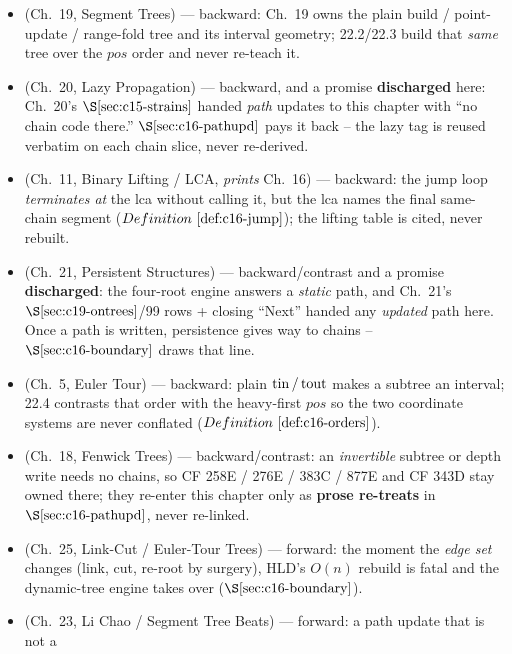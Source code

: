 \begin{itemize}[nosep, leftmargin=1.4em]
  \item {} (Ch.~19, Segment Trees) --- backward: Ch.~19 owns the plain
        build / point-update / range-fold tree and its interval geometry; 22.2/22.3 build that
        \emph{same} tree over the \(\mathit{pos}\) order and never re-teach it.
  \item {} (Ch.~20, Lazy Propagation) --- backward, and a promise \textbf{discharged}
        here: Ch.~20's \(\secref{c15-strains}\) handed \emph{path} updates to this chapter with
        ``no chain code there.'' \(\secref{c16-pathupd}\) pays it back -- the lazy tag is reused
        verbatim on each chain slice, never re-derived.
  \item {} (Ch.~11, Binary Lifting / LCA, \emph{prints} Ch.~16) --- backward: the jump
        loop \emph{terminates at} the lca without calling it, but the lca names the final same-chain
        segment (\(\defref{c16-jump}\)); the lifting table is cited, never rebuilt.
  \item {} (Ch.~21, Persistent Structures) --- backward/contrast and a promise
        \textbf{discharged}: the four-root engine answers a \emph{static} path, and Ch.~21's
        \(\secref{c19-ontrees}\)/99 rows + closing ``Next'' handed any \emph{updated} path here. Once a path is
        written, persistence gives way to chains -- \(\secref{c16-boundary}\) draws that line.
  \item {} (Ch.~5, Euler Tour) --- backward: plain \(\operatorname{tin}/\operatorname{tout}\) makes a subtree an
        interval; 22.4 contrasts that order with the heavy-first \(\mathit{pos}\) so the two
        coordinate systems are never conflated (\(\defref{c16-orders}\)).
  \item {} (Ch.~18, Fenwick Trees) --- backward/contrast: an \emph{invertible} subtree or
        depth write needs no chains, so CF 258E / 276E / 383C / 877E and CF 343D stay owned there;
        they re-enter this chapter only as \textbf{prose re-treats} in \(\secref{c16-pathupd}\),
        never re-linked.
  \item {} (Ch.~25, Link-Cut / Euler-Tour Trees) --- forward: the moment the
        \emph{edge set} changes (link, cut, re-root by surgery), HLD's \(O(n)\) rebuild is fatal and
        the dynamic-tree engine takes over (\(\secref{c16-boundary}\)).
  \item {} (Ch.~23, Li Chao / Segment Tree Beats) --- forward: a path update that is not a

\end{itemize}
